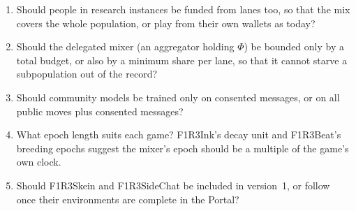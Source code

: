 \documentclass[11pt,a4paper]{article}
\begin{document}
\begin{enumerate}[itemsep=2pt]
\item Should people in research instances be funded from lanes too, so that the mix covers the
  whole population, or play from their own wallets as today?
\item Should the delegated mixer (an aggregator holding $\Phi$) be bounded only by a total budget,
  or also by a minimum share per lane, so that it cannot starve a subpopulation out of the record?
\item Should community models be trained only on consented messages, or on all public moves plus
  consented messages?
\item What epoch length suits each game? F1R3Ink's decay unit and F1R3Beat's breeding epochs
  suggest the mixer's epoch should be a multiple of the game's own clock.
\item Should F1R3Skein and F1R3SideChat be included in version~1, or follow once their environments
  are complete in the Portal?
\end{enumerate}
\end{document}
